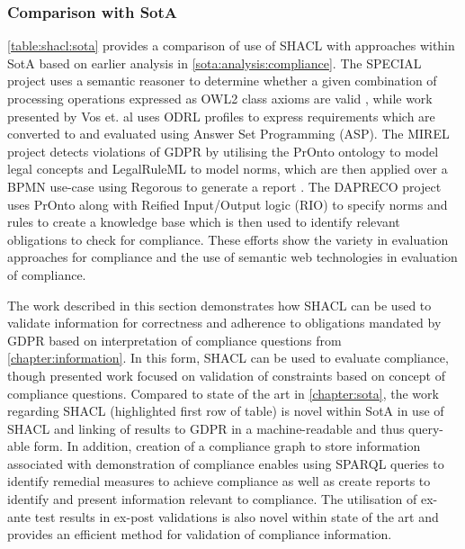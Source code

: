 \subsubsection*{Comparison with SotA}
\autoref{table:shacl:sota} provides a comparison of use of SHACL with approaches within SotA based on earlier analysis in \autoref{sota:analysis:compliance}.
The SPECIAL project uses a semantic reasoner to determine whether a given combination of processing operations expressed as OWL2 class axioms are valid \cite{westphal_spirit_2018}, while work presented by Vos et. al \cite{vos_odrl_2019} uses ODRL profiles to express requirements which are converted to and evaluated using Answer Set Programming (ASP).
The MIREL project detects violations of GDPR by utilising the PrOnto ontology \cite{palmirani_pronto_2018,palmirani_pronto_compliance_2018,monica_modelling_2018} to model legal concepts and LegalRuleML to model norms, which are then applied over a BPMN use-case using Regorous to generate a report \cite{monica_modelling_2018}.
The DAPRECO project uses PrOnto along with Reified Input/Output logic (RIO) \cite{robaldo_reified_2017} to specify norms and rules to create a knowledge base \cite{bartolini_agile_2019} which is then used to identify relevant obligations to check for compliance.
These efforts show the variety in evaluation approaches for compliance and the use of semantic web technologies in evaluation of compliance.

The work described in this section demonstrates how SHACL can be used to validate information for correctness and adherence to obligations mandated by GDPR based on interpretation of compliance questions from \autoref{chapter:information}. In this form, SHACL can be used to evaluate compliance, though presented work focused on validation of constraints based on concept of compliance questions.
Compared to state of the art in \autoref{chapter:sota}, the work regarding SHACL (highlighted first row of table) is novel within SotA in use of SHACL and linking of results to GDPR in a machine-readable and thus query-able form.
In addition, creation of a compliance graph to store information associated with demonstration of compliance enables using SPARQL queries to identify remedial measures to achieve compliance as well as create reports to identify and present information relevant to compliance.
The utilisation of ex-ante test results in ex-post validations is also novel within state of the art and provides an efficient method for validation of compliance information.

